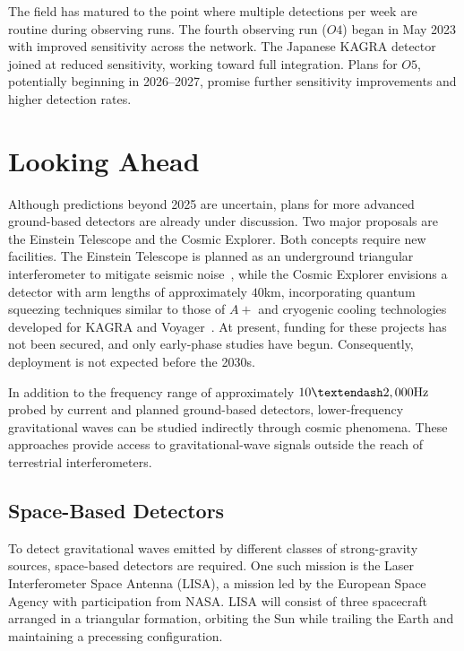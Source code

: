 The field has matured to the point where multiple detections per week are routine during observing runs.
The fourth observing run ($O4$) began in May 2023 with improved sensitivity across the network.
The Japanese KAGRA detector joined at reduced sensitivity, working toward full integration.
Plans for $O5$, potentially beginning in 2026--2027, promise further sensitivity improvements and higher detection rates.

\section{Looking Ahead}\label{sec:looking-ahead}
Although predictions beyond 2025 are uncertain, plans for more advanced ground-based detectors are already under discussion.
Two major proposals are the Einstein Telescope and the Cosmic Explorer.
Both concepts require new facilities.
The Einstein Telescope is planned as an underground triangular interferometer to mitigate seismic noise~\cite{etscienceteam_einstein_2011}, while the Cosmic Explorer envisions a detector with arm lengths of approximately  $40$km, incorporating quantum squeezing techniques similar to those of $A+$ and cryogenic cooling technologies developed for KAGRA and Voyager~\cite{hall_cosmic_2022}.
At present, funding for these projects has not been secured, and only early-phase studies have begun.
Consequently, deployment is not expected before the 2030s.


In addition to the frequency range of approximately $10\textendash2,000 \text{Hz}$ probed by current and planned ground-based detectors, lower-frequency gravitational waves can be studied indirectly through cosmic phenomena.
These approaches provide access to gravitational-wave signals outside the reach of terrestrial interferometers.

\subsection{Space-Based Detectors}\label{subsec:space-based-detectors}


To detect gravitational waves emitted by different classes of strong-gravity sources, space-based detectors are required.
One such mission is the Laser Interferometer Space Antenna (LISA), a mission led by the European Space Agency with participation from NASA. LISA will consist of three spacecraft arranged in a triangular formation, orbiting the Sun while trailing the Earth and maintaining a precessing configuration.


